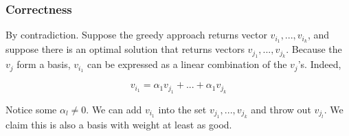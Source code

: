 \subsubsection{Correctness}

By contradiction. Suppose the greedy approach returns vector $v_{i_1},
..., v_{i_k}$,
and suppose there is an optimal solution that returns vectors
$v_{j_1}, ..., v_{j_k}$. Because the $v_j$ form a basis, $v_{i_1}$ can
be expressed as a linear combination of the $v_j$'s. Indeed,

$$
v_{i_1} = \alpha_1v_{j_1} + ... + \alpha_1v_{j_k} 
$$

Notice some $\alpha_l \neq 0$. We can add $v_{i_1}$ into the set
$v_{j_1}, ..., v_{j_k}$ and throw out $v_{j_l}$. We claim this is also
a basis with weight at least as good.